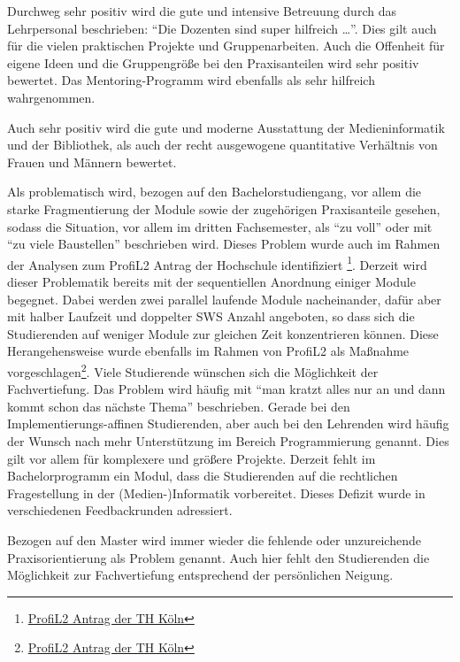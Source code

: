 Durchweg sehr positiv wird die gute und intensive Betreuung durch das
Lehrpersonal beschrieben: ``Die Dozenten sind super hilfreich
\ldots{}''. Dies gilt auch für die vielen praktischen Projekte und
Gruppenarbeiten. Auch die Offenheit für eigene Ideen und die
Gruppengröße bei den Praxisanteilen wird sehr positiv bewertet. Das
Mentoring-Programm wird ebenfalls als sehr hilfreich wahrgenommen.

Auch sehr positiv wird die gute und moderne Ausstattung der
Medieninformatik und der Bibliothek, als auch der recht ausgewogene
quantitative Verhältnis von Frauen und Männern bewertet.

Als problematisch wird, bezogen auf den Bachelorstudiengang, vor allem
die starke Fragmentierung der Module sowie der zugehörigen Praxisanteile
gesehen, sodass die Situation, vor allem im dritten Fachsemester, als
``zu voll'' oder mit ``zu viele Baustellen'' beschrieben wird. Dieses
Problem wurde auch im Rahmen der Analysen zum ProfiL2 Antrag der
Hochschule identifiziert \footnote{\href{https://www.th-koeln.de/mam/downloads/deutsch/hochschule/profil/lehre/profil2_antrag_ministerium.pdf}{ProfiL2
  Antrag der TH Köln}}. Derzeit wird dieser Problematik bereits mit der
sequentiellen Anordnung einiger Module begegnet. Dabei werden zwei
parallel laufende Module nacheinander, dafür aber mit halber Laufzeit
und doppelter SWS Anzahl angeboten, so dass sich die Studierenden auf
weniger Module zur gleichen Zeit konzentrieren können. Diese
Herangehensweise wurde ebenfalls im Rahmen von ProfiL2 als Maßnahme
vorgeschlagen\footnote{\href{https://www.th-koeln.de/mam/downloads/deutsch/hochschule/profil/lehre/profil2_antrag_ministerium.pdf}{ProfiL2
  Antrag der TH Köln}}. Viele Studierende wünschen sich die Möglichkeit
der Fachvertiefung. Das Problem wird häufig mit ``man kratzt alles nur
an und dann kommt schon das nächste Thema'' beschrieben. Gerade bei den
Implementierungs-affinen Studierenden, aber auch bei den Lehrenden wird
häufig der Wunsch nach mehr Unterstützung im Bereich Programmierung
genannt. Dies gilt vor allem für komplexere und größere Projekte.
Derzeit fehlt im Bachelorprogramm ein Modul, dass die Studierenden auf
die rechtlichen Fragestellung in der (Medien-)Informatik vorbereitet.
Dieses Defizit wurde in verschiedenen Feedbackrunden adressiert.

Bezogen auf den Master wird immer wieder die fehlende oder unzureichende
Praxisorientierung als Problem genannt. Auch hier fehlt den Studierenden
die Möglichkeit zur Fachvertiefung entsprechend der persönlichen
Neigung.

